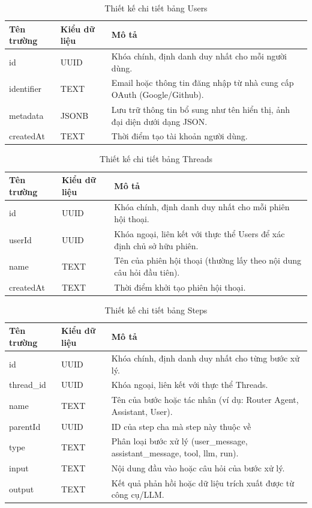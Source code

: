 \documentclass[../DoAn.tex]{subfiles}
\begin{document}
\begin{table}[H]
\centering
\begin{tabular}{|l|l|p{8cm}|}
\hline
\textbf{Tên trường} & \textbf{Kiểu dữ liệu} & \textbf{Mô tả} \\ \hline
id & UUID & Khóa chính, định danh duy nhất cho mỗi người dùng. \\ \hline
identifier & TEXT & Email hoặc thông tin đăng nhập từ nhà cung cấp OAuth (Google/Github). \\ \hline
metadata & JSONB & Lưu trữ thông tin bổ sung như tên hiển thị, ảnh đại diện dưới dạng JSON. \\ \hline
createdAt & TEXT & Thời điểm tạo tài khoản người dùng. \\ \hline
\end{tabular}
\caption{Thiết kế chi tiết bảng Users}
\end{table}

\begin{table}[H]
\centering
\begin{tabular}{|l|l|p{8cm}|}
\hline
\textbf{Tên trường} & \textbf{Kiểu dữ liệu} & \textbf{Mô tả} \\ \hline
id & UUID & Khóa chính, định danh duy nhất cho mỗi phiên hội thoại. \\ \hline
userId & UUID & Khóa ngoại, liên kết với thực thể Users để xác định chủ sở hữu phiên. \\ \hline
name & TEXT & Tên của phiên hội thoại (thường lấy theo nội dung câu hỏi đầu tiên). \\ \hline
createdAt & TEXT & Thời điểm khởi tạo phiên hội thoại. \\ \hline
\end{tabular}
\caption{Thiết kế chi tiết bảng Threads}
\end{table}

\begin{table}[H]
\centering
\begin{tabular}{|l|l|p{8cm}|}
\hline
\textbf{Tên trường} & \textbf{Kiểu dữ liệu} & \textbf{Mô tả} \\ \hline
id & UUID & Khóa chính, định danh duy nhất cho từng bước xử lý. \\ \hline
thread\_id & UUID & Khóa ngoại, liên kết với thực thể Threads. \\ \hline
name & TEXT & Tên của bước hoặc tác nhân (ví dụ: Router Agent, Assistant, User). \\ \hline
parentId & UUID & ID của step cha mà step này thuộc về \\ \hline
type & TEXT & Phân loại bước xử lý (user\_message, assistant\_message, tool, llm, run). \\ \hline
input & TEXT & Nội dung đầu vào hoặc câu hỏi của bước xử lý. \\ \hline
output & TEXT & Kết quả phản hồi hoặc dữ liệu trích xuất được từ công cụ/LLM. \\ \hline
\end{tabular}
\caption{Thiết kế chi tiết bảng Steps}
\end{table}
\end{document}
